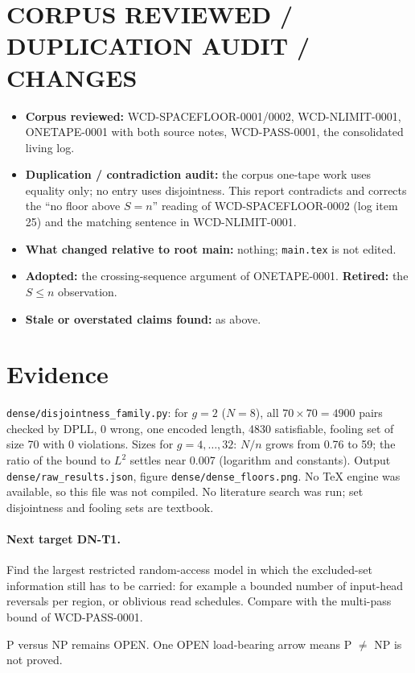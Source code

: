 \documentclass[11pt]{article}
\begin{document}
\section{CORPUS REVIEWED / DUPLICATION AUDIT / CHANGES}
\begin{itemize}
\item \textbf{Corpus reviewed:} WCD-SPACEFLOOR-0001/0002, WCD-NLIMIT-0001, ONETAPE-0001 with both source notes, WCD-PASS-0001, the consolidated living log.
\item \textbf{Duplication / contradiction audit:} the corpus one-tape work uses equality only; no entry uses disjointness. This report contradicts and corrects the ``no floor above $S=n$'' reading of WCD-SPACEFLOOR-0002 (log item 25) and the matching sentence in WCD-NLIMIT-0001.
\item \textbf{What changed relative to root main:} nothing; \texttt{main.tex} is not edited.
\item \textbf{Adopted:} the crossing-sequence argument of ONETAPE-0001. \textbf{Retired:} the $S\le n$ observation.
\item \textbf{Stale or overstated claims found:} as above.
\end{itemize}

\section{Evidence}
\texttt{dense/disjointness\_family.py}: for $g=2$ ($N=8$), all $70\times70=4900$ pairs checked by DPLL, 0 wrong, one encoded length, 4830 satisfiable, fooling set of size 70 with 0 violations. Sizes for $g=4,\dots,32$: $N/n$ grows from 0.76 to 59; the ratio of the bound to $L^{2}$ settles near 0.007 (logarithm and constants). Output \texttt{dense/raw\_results.json}, figure \texttt{dense/dense\_floors.png}. No TeX engine was available, so this file was not compiled. No literature search was run; set disjointness and fooling sets are textbook.

\paragraph{Next target DN-T1.} Find the largest restricted random-access model in which the excluded-set information still has to be carried: for example a bounded number of input-head reversals per region, or oblivious read schedules. Compare with the multi-pass bound of WCD-PASS-0001.

\medskip\noindent P versus NP remains OPEN. One OPEN load-bearing arrow means P $\ne$ NP is not proved.
\end{document}
